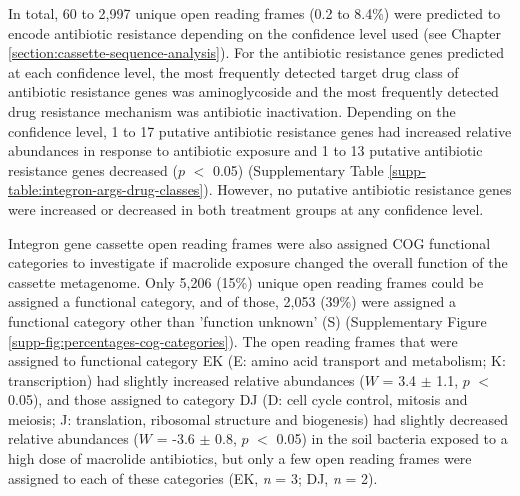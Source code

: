 In total, 60 to 2,997 unique open reading frames (0.2 to 8.4\%) were predicted to encode antibiotic resistance depending on the confidence level used (see Chapter \ref{section:cassette-sequence-analysis}).
For the antibiotic resistance genes predicted at each confidence level, the most frequently detected target drug class of antibiotic resistance genes was aminoglycoside and the most frequently detected drug resistance mechanism was antibiotic inactivation.
Depending on the confidence level, 1 to 17 putative antibiotic resistance genes had increased relative abundances in response to antibiotic exposure and 1 to 13 putative antibiotic resistance genes decreased ($p$ $<$ 0.05) (Supplementary Table \ref{supp-table:integron-args-drug-classes}).
However, no putative antibiotic resistance genes were increased or decreased in both treatment groups at any confidence level.

Integron gene cassette open reading frames were also assigned COG functional categories to investigate if macrolide exposure changed the overall function of the cassette metagenome.
Only 5,206 (15\%) unique open reading frames could be assigned a functional category, and of those, 2,053 (39\%) were assigned a functional category other than 'function unknown' (S) (Supplementary Figure \ref{supp-fig:percentages-cog-categories}).
The open reading frames that were assigned to functional category EK (E: amino acid transport and metabolism; K: transcription) had slightly increased relative abundances ($W$ = 3.4 $\pm$ 1.1, $p$ $<$ 0.05), and those assigned to category DJ (D: cell cycle control, mitosis and meiosis; J: translation, ribosomal structure and biogenesis) had slightly decreased relative abundances ($W$ = -3.6 $\pm$ 0.8, $p$ $<$ 0.05) in the soil bacteria exposed to a high dose of macrolide antibiotics, but only a few open reading frames were assigned to each of these categories (EK, \textit{n} = 3; DJ, \textit{n} = 2).
